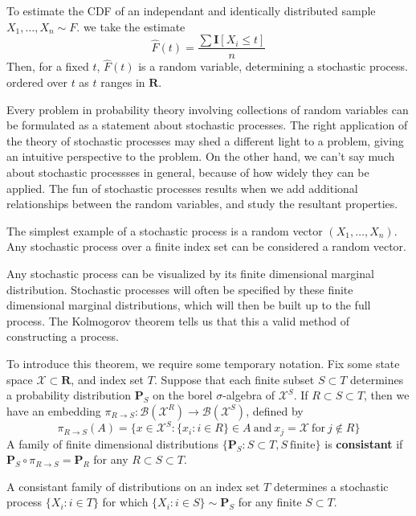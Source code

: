 \begin{example}
    To estimate the CDF of an independant and identically distributed sample $X_1, \dots, X_n \sim F$. we take the estimate
    \[ \hat{F}(t) = \frac{\sum \mathbf{I}[X_i \leq t]}{n} \]
    Then, for a fixed $t$, $\hat{F}(t)$ is a random variable, determining a stochastic process. ordered over $t$ as $t$ ranges in $\mathbf{R}$.
\end{example}

Every problem in probability theory involving collections of random variables can be formulated as a statement about stochastic processes. The right application of the theory of stochastic processes may shed a different light to a problem, giving an intuitive perspective to the problem. On the other hand, we can't say much about stochastic processses in general, because of how widely they can be applied. The fun of stochastic processes results when we add additional relationships between the random variables, and study the resultant properties.

\begin{example}
    The simplest example of a stochastic process is a random vector $(X_1, \dots, X_n)$. Any stochastic process over a finite index set can be considered a random vector.
\end{example}

Any stochastic process can be visualized by its finite dimensional marginal distribution. Stochastic processes will often be specified by these finite dimensional marginal distributions, which will then be built up to the full process. The Kolmogorov theorem tells us that this a valid method of constructing a process.

To introduce this theorem, we require some temporary notation. Fix some state space $\mathcal{X} \subset \mathbf{R}$, and index set $T$. Suppose that each finite subset $S \subset T$ determines a probability distribution $\mathbf{P}_S$ on the borel $\sigma$-algebra of $\mathcal{X}^S$. If $R \subset S \subset T$, then we have an embedding $\pi_{R \to S} : \mathcal{B}(\mathcal{X}^R) \to \mathcal{B}(\mathcal{X}^S)$, defined by
%
\[ \pi_{R \to S}(A) = \{ x \in \mathcal{X}^S : \{ x_i : i \in R \} \in A\ \text{and}\ x_j = \mathcal{X}\ \text{for}\ j \not \in R \} \]
%
A family of finite dimensional distributions $\{ \mathbf{P}_S : S \subset T, S\ \text{finite} \}$ is {\bf consistant} if $\mathbf{P}_S \circ \pi_{R \to S} = \mathbf{P}_R$ for any $R \subset S \subset T$.

\begin{theorem}
    A consistant family of distributions on an index set $T$ determines a stochastic process $\{ X_i : i \in T \}$ for which $\{X_i : i \in S \} \sim \mathbf{P}_{S}$ for any finite $S \subset T$.
\end{theorem}

